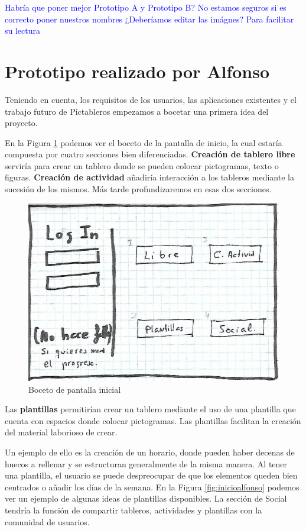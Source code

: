\textcolor{blue}{Habría que poner mejor Prototipo A y Prototipo B? No estamos  seguros si es correcto poner nuestros nombres}
\textcolor{blue}{¿Deberíamos editar las imágnes? Para facilitar su lectura}
\section*{Prototipo realizado por Alfonso}

Teniendo en cuenta, los requisitos de los usuarios, las aplicaciones existentes y el trabajo futuro de Pictableros empezamos a bocetar una primera idea del proyecto.


En la Figura \ref{fig:loginalfonso} podemos ver el boceto de la pantalla de  inicio, la cual estaría compuesta por cuatro secciones bien diferenciadas.\textbf{ Creación de tablero libre} serviría para crear un tablero donde se pueden colocar pictogramas, texto o figuras. \textbf{Creación de actividad} añadiría interacción a los tableros mediante la sucesión de los mismos. Más tarde profundizaremos en esas dos secciones.

\begin{figure}[h!]
	\centering
	\includegraphics[width=0.7\linewidth]{Imagenes/Bitmap/logInAlfonso}
	\caption{Boceto de pantalla inicial}
	\label{fig:loginalfonso}
\end{figure}

Las \textbf{plantillas} permitirían crear un tablero mediante el uso de una plantilla que cuenta con espacios donde colocar pictogramas. Las plantillas facilitan la creación del material laborioso de crear.

Un ejemplo de ello es la creación de un horario, donde pueden haber decenas de huecos a rellenar y se estructuran generalmente de la misma manera. Al tener una plantilla, el usuario se puede despreocupar de que los elementos queden bien centrados o añadir los días de la semana. En la Figura \ref{fig:inicioalfonso} podemos ver un ejemplo de algunas ideas de plantillas disponibles. La sección de Social tendría la función de compartir tableros, actividades y plantillas con la comunidad de usuarios.

